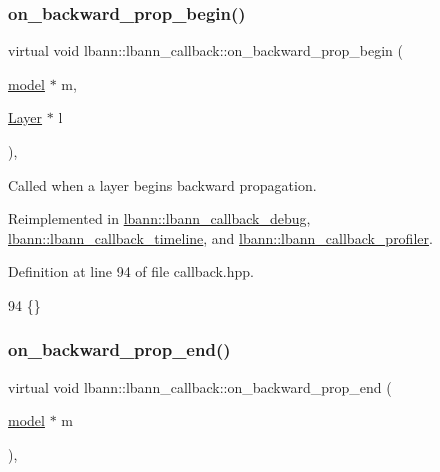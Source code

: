 \subsubsection{\texorpdfstring{on\+\_\+backward\+\_\+prop\+\_\+begin()}{on\_backward\_prop\_begin()}\hspace{0.1cm}{\footnotesize\ttfamily [2/2]}}
{\footnotesize\ttfamily virtual void lbann\+::lbann\+\_\+callback\+::on\+\_\+backward\+\_\+prop\+\_\+begin (\begin{DoxyParamCaption}\item[{\hyperlink{classlbann_1_1model}{model} $\ast$}]{m,  }\item[{\hyperlink{classlbann_1_1Layer}{Layer} $\ast$}]{l }\end{DoxyParamCaption})\hspace{0.3cm}{\ttfamily [inline]}, {\ttfamily [virtual]}}

Called when a layer begins backward propagation. 

Reimplemented in \hyperlink{classlbann_1_1lbann__callback__debug_adaf60c995d2638a40d9c87a923c53865}{lbann\+::lbann\+\_\+callback\+\_\+debug}, \hyperlink{classlbann_1_1lbann__callback__timeline_a81d50e48462765b5e9913ae357b5a412}{lbann\+::lbann\+\_\+callback\+\_\+timeline}, and \hyperlink{classlbann_1_1lbann__callback__profiler_a158d8d47bd7a2e38a1f5589030fa523b}{lbann\+::lbann\+\_\+callback\+\_\+profiler}.



Definition at line 94 of file callback.\+hpp.


\begin{DoxyCode}
94 \{\}
\end{DoxyCode}
\mbox{\label{classlbann_1_1lbann__callback_af183624e63ba65e0003fa988f53dee0c}} 
\subsubsection{\texorpdfstring{on\+\_\+backward\+\_\+prop\+\_\+end()}{on\_backward\_prop\_end()}\hspace{0.1cm}{\footnotesize\ttfamily [1/2]}}
{\footnotesize\ttfamily virtual void lbann\+::lbann\+\_\+callback\+::on\+\_\+backward\+\_\+prop\+\_\+end (\begin{DoxyParamCaption}\item[{\hyperlink{classlbann_1_1model}{model} $\ast$}]{m }\end{DoxyParamCaption})\hspace{0.3cm}{\ttfamily [inline]}, {\ttfamily [virtual]}}

